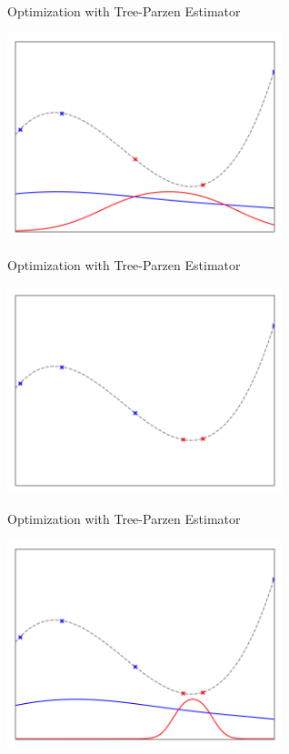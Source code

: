 \begin{frame}[c]{Optimization with Tree-Parzen Estimator}

\centering
\includegraphics[width=0.6\textwidth]{w07_hpo_grey_box/images/tpe/tpeiter_1_pdfs.png}


\end{frame}
\begin{frame}[c]{Optimization with Tree-Parzen Estimator}

\centering
\includegraphics[width=0.6\textwidth]{w07_hpo_grey_box/images/tpe/tpeiter_2_observations.png}


\end{frame}
\begin{frame}[c]{Optimization with Tree-Parzen Estimator}

\centering
\includegraphics[width=0.6\textwidth]{w07_hpo_grey_box/images/tpe/tpeiter_2_pdfs.png}


\end{frame}
